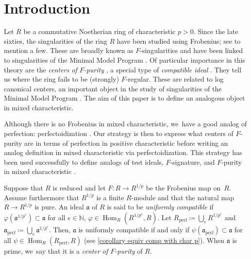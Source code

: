 \documentclass[11pt]{article}
\let\autoref\cref
\theoremstyle{plain}
\theoremstyle{definition}
\numberwithin{equation}{theorem}
\newcommand{\N}{\mathbb {N}}
\newcommand{\fra}{\mathfrak{a}}
\DeclareMathOperator{\Hom}{Hom}
\newcommand{\perf}{_{\mathrm{perf}}}
\newcommand{\unpe}{{1/{p^e}}}
\newcommand{\unp}{{1/{p}}}
\renewcommand{\phi}{\varphi}
\begin{document}
\section{Introduction}

Let $R$ be a commutative Noetherian ring of characteristic $p>0$. Since the late sixties, the singularities of the ring $R$ have been studied using Frobenius; see \cite{KunzCharacterizationsOfRegularLocalRings,HochsterHunekeTC1,HochsterFoundations,HochsterHunekeTightClosureAndStrongFRegularity,SmithFRatImpliesRat,MehtaRamanathanFrobeniusSplittingAndCohomologyVanishing} to mention a few.
These are broadly known as $F$-singularities and have been linked to singularities of the Minimal Model Program \cite{SchwedeFInjectiveAreDuBois,SmithFRatImpliesRat,SmithMultiplierTestIdeals}.
Of particular importance in this theory are the \emph{centers of $F$-purity} \cite{SchwedeCentersOfFPurity}, a special type of \emph{compatible ideal} \cite{MehtaRamanathanFrobeniusSplittingAndCohomologyVanishing}. They tell us where the ring fails to be (strongly) $F$-regular.
These are related to log canonical centers, an important object in the study of singularities of the Minimal Model Program \cite{AmbroLCCENTERS}.
The aim of this paper is to define an analogous object in mixed characteristic.

Although there is no Frobenius in mixed characteristic, we~have a good analog of perfection: perfectoidization \cite{ScholzePerfectoidSpaces,BhattScholzePrisms}. Our strategy is then to express what centers of $F$-purity are in terms of perfection in positive characteristic before writing an analog definition in mixed characteristic via perfectoidization. This strategy has been used successfully to define analogs of test ideals, $F$-signature, and $F$-purity in mixed characteristic \cite{MaSchwedePerfectoidTestIdeal,CaiLeeMaSchwedeTuckerPerfectoidSignature,BMPSTWWPerfectoidPure}.

Suppose that $R$ is reduced and let $F\colon R\to R^\unp$ be the Frobenius map on~$R$. Assume furthermore that $R^\unp$ is a finite $R$\nobreakdash-module and that the natural map \hbox{$R\to R^\unp$} is pure. An ideal $\fra$ of $R$ is said to be \emph{uniformly compatible} if $\phi(\fra^\unpe)\subset \fra$ for all $e\in \N$, $\phi\in \Hom_R(R^\unpe,R)$. Let $R\perf\coloneqq \bigcup_e R^\unpe$ and $\fra\perf\coloneqq \bigcup_e \fra^\unpe$. Then, $\fra$ is uniformly compatible if and only if $\psi(\fra\perf)\subset \fra$ for all $\psi\in \Hom_R(R\perf,R)$
(see \autoref{corollary equiv comp with char p}).
When $\fra$ is prime, we~say that it is a \emph{center of $F$-purity} of $R$.
\end{document}
